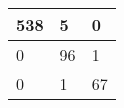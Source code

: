 \begin{tabular}{lll}
\hline
  538 & 5 & 0 \\
\hline
  0 & 96 & 1 \\
\hline
  0 & 1 & 67 \\
\hline
\end{tabular}
